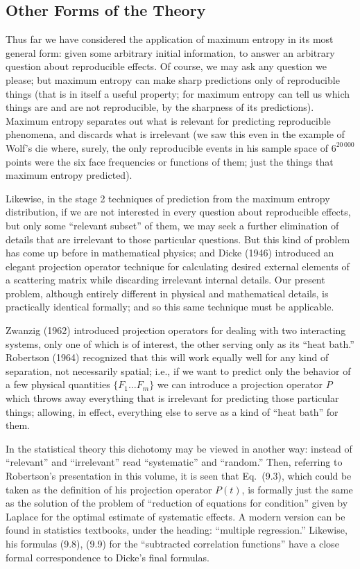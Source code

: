 \subsection*{Other Forms of the Theory}
Thus far we have considered the application of maximum entropy in its most general form: given some arbitrary initial information, to answer an arbitrary question about reproducible effects.
Of course, we may ask any question we please; but maximum entropy can make sharp predictions only of reproducible things (that is in itself a useful property; for maximum entropy can tell us which things are and are not reproducible, by the sharpness of its predictions).
Maximum entropy separates out what is relevant for predicting reproducible phenomena, and discards what is irrelevant (we saw this even in the example of Wolf's die where, surely, the only reproducible events in his sample space of $6^{20\,000}$ points were the six face frequencies or functions of them; just the things that maximum entropy predicted).

Likewise, in the stage 2 techniques of prediction from the maximum entropy distribution, if we are not interested in every question about reproducible effects, but only some ``relevant subset'' of them, we may seek a further elimination of details that are irrelevant to those particular questions.
But this kind of problem has come up before in mathematical physics; and Dicke (1946) introduced an elegant projection operator technique for calculating desired external elements of a scattering matrix while discarding irrelevant internal details.
Our present problem, although entirely different in physical and mathematical details, is practically identical formally; and so this same technique must be applicable.

Zwanzig (\cite{zwanzig}{1962}) introduced projection operators for dealing with two interacting systems, only one of which is of interest, the other serving only as its ``heat bath.''
Robertson (\cite{robertson}{1964}) recognized that this will work equally well for any kind of separation, not necessarily spatial; i.e., if we want to predict only the behavior of a few physical quantities $\{F_1 \ldots F_m\}$ we can introduce a projection operator $P$ which throws away everything that is irrelevant for predicting those particular things; allowing, in effect, everything else to serve as a kind of ``heat bath'' for them.

In the statistical theory this dichotomy may be viewed in another way: instead of ``relevant'' and ``irrelevant'' read ``systematic'' and ``random.''
Then, referring to Robertson's presentation in this volume, it is seen that Eq.~(9.3), which could be taken as the definition of his projection operator $P(t)$, is formally just the same as the solution of the problem of ``reduction of equations for condition'' given by Laplace for the optimal estimate of systematic effects.
A modern version can be found in statistics textbooks, under the heading: ``multiple regression.''
Likewise, his formulas (9.8), (9.9) for the ``subtracted correlation functions'' have a close formal correspondence to Dicke's final formulas.

